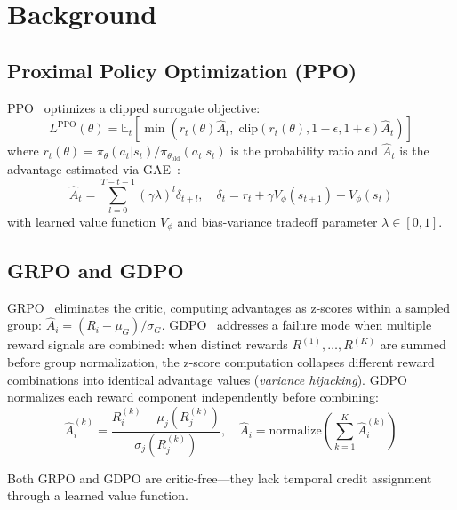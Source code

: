 \documentclass[11pt,a4paper]{article}
\begin{document}
\section{Background}

\subsection{Proximal Policy Optimization (PPO)}

PPO~\cite{schulman2017ppo} optimizes a clipped surrogate objective:
\begin{equation}
L^{\text{PPO}}(\theta) = \mathbb{E}_t \left[ \min \left( r_t(\theta) \hat{A}_t, \; \text{clip}\left(r_t(\theta), 1{-}\epsilon, 1{+}\epsilon\right) \hat{A}_t \right) \right]
\end{equation}
where $r_t(\theta) = \pi_\theta(a_t|s_t) / \pi_{\theta_{\text{old}}}(a_t|s_t)$ is the probability ratio and $\hat{A}_t$ is the advantage estimated via GAE~\cite{schulman2015gae}:
\begin{equation}
\hat{A}_t = \sum_{l=0}^{T-t-1} (\gamma \lambda)^l \delta_{t+l}, \quad \delta_t = r_t + \gamma V_\phi(s_{t+1}) - V_\phi(s_t)
\end{equation}
with learned value function $V_\phi$ and bias-variance tradeoff parameter $\lambda \in [0,1]$.

\subsection{GRPO and GDPO}

GRPO~\cite{shao2024grpo} eliminates the critic, computing advantages as z-scores within a sampled group: $\hat{A}_i = (R_i - \mu_G) / \sigma_G$. GDPO~\cite{shao2024gdpo} addresses a failure mode when multiple reward signals are combined: when distinct rewards $R^{(1)}, \ldots, R^{(K)}$ are summed before group normalization, the z-score computation collapses different reward combinations into identical advantage values (\emph{variance hijacking}). GDPO normalizes each reward component independently before combining:
\begin{equation}
\hat{A}_i^{(k)} = \frac{R_i^{(k)} - \mu_j(R_j^{(k)})}{\sigma_j(R_j^{(k)})}, \quad \hat{A}_i = \text{normalize}\!\left(\sum_{k=1}^{K} \hat{A}_i^{(k)}\right)
\end{equation}

Both GRPO and GDPO are critic-free---they lack temporal credit assignment through a learned value function.
\end{document}
